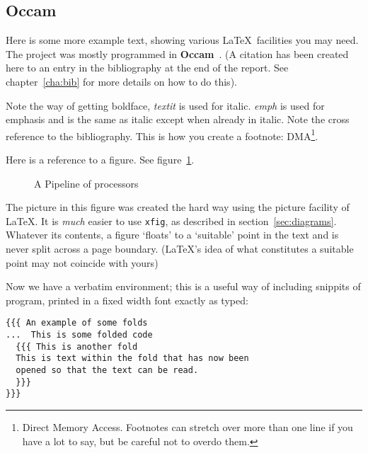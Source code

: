 \subsection{Occam}

Here is some more example text, showing various \LaTeX\ facilities
you may need.  The project was mostly programmed in
\textbf{Occam}~\cite{occam}.  (A citation has been created  here to an
entry in the bibliography at the end of the report. See
chapter~\ref{cha:bib} for more details on how to do this).

Note the way of getting boldface, \textit{textit} is used for italic.
\emph{emph} is used for emphasis and is the same as italic except when
already in italic.  Note the cross reference to the bibliography.
This is how you create a footnote: DMA\footnote{Direct Memory Access.
  Footnotes can stretch over more than one line if you have a lot to
  say, but be careful not to overdo them.}.

Here is a reference to a figure. See figure~\ref{pipeline}.
\begin{figure}[htbp]
  \centering
  
  \caption{A Pipeline of processors
    \label{pipeline}}           %
\end{figure}
The picture in this figure was created the hard way using the picture
facility of \LaTeX. It is \emph{much} easier to use \texttt{xfig}, as
described in section~\ref{sec:diagrams}.  Whatever its contents, a
figure `floats' to a `suitable' point in the text and is never split
across a page boundary. (\LaTeX's idea of what constitutes a suitable
point may not coincide with yours)


Now we have a verbatim environment; this is a useful way of including
snippits of program, printed in a fixed width font exactly as typed:

\begin{verbatim}
{{{ An example of some folds
...  This is some folded code
  {{{ This is another fold
  This is text within the fold that has now been
  opened so that the text can be read.
  }}}
}}}
\end{verbatim}
